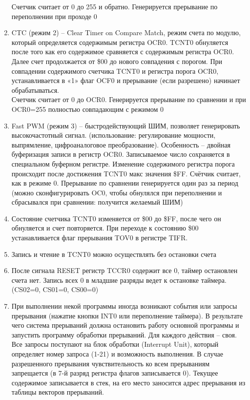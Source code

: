 \documentclass{article}
\begin{document}
\begin{enumerate}
Счетчик считает от 0 до 255 и обратно. Генерируется прерывание по переполнении при проходе 0 
		\item CTC (режим 2) – Clear Timer on Compare Match, режим счета по модулю, который определяется содержимым регистра OCR0. TCNT0 обнуляется после того как его содержимое сравняется с содержимым регистра OCR0. Далее счет продолжается от \$00 до нового совпадения с порогом. При совпадении содержимого счетчика TCNT0 и регистра порога OCR0, устанавливается в «1» флаг OCF0 и прерывание (если разрешено) начинает обрабатываться. \\
Счетчик считает от 0 до OCR0. Генерируется прерывание по сравнении и при OCR0=255 полностью совпадающим с режимом 0 
		\item Fast PWM (режим 3) – быстродействующий ШИМ, позволяет генерировать высокочастотный сигнал. (использование: регулирование мощности, выпрямление, цифроаналоговое преобразование). Особенность – двойная буферизация записи в регистр OCR0. Записываемое число сохраняется в специальном буферном регистре. Изменение содержимого регистра порога происходит после достижения TCNT0 макс значения \$FF. 
Счётчик считает, как в режиме 0. Прерывание по сравнении генерируется один раз за период (можно сконфигурировать OC0, чтобы обнулялся при переполнении и сбрасывался при сравнении: получится желаемый ШИМ) 
		\item Состояние счетчика TCNT0 изменяется от \$00 до \$FF, после чего он обнуляется и счет повторяется. При переходе к состоянию \$00 устанавливается флаг прерывания TOV0 в регистре TIFR. 
		\item Запись и чтение в TCNT0 можно осуществлять без остановки счета
		\item После сигнала RESET регистр TCCR0 содержит все 0, таймер остановлен счета нет.  Запись всех 0 в младшие разряды ведет к остановке таймера. (CS02=0, CS01=0, CS00=0) 
		\item При выполнении некой программы иногда возникают события или запросы прерывания (нажатие кнопки INT0 или переполнение таймера). В результате чего система прерываний должна остановить работу основной программы и запустить программу обработки прерываний. Для каждого действия – своя.   
Все запросы поступают на блок обработки (Interrupt Unit), который определяет номер запроса (1-21) и возможность выполнения. В случае разрешенного прерывания чувствительность ко всем прерываниям запрещается (в 7-й разряд регистра флагов записывается 0). Текущее содержимое записывается в стек, на его место заносится адрес прерывания из таблицы векторов прерываний. 

\end{enumerate}
\end{document}
